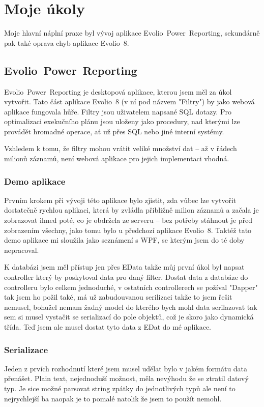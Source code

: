 \documentclass[czech,bachelor,dept460,male,csharp]{diploma}
\newcommand{\EvolioEight}{Evolio~8}
\newcommand{\EFilters}{Evolio~Power~Reporting}
\newcommand{\EData}{EData}
\begin{document}
\section{Moje úkoly}
	Moje hlavní náplní praxe byl vývoj aplikace {\EFilters}, sekundárně pak také oprava chyb aplikace {\EvolioEight}.
	\subsection{\EFilters}
		{\EFilters} je desktopová aplikace, kterou jsem měl za úkol vytvořit. Tato část aplikace {\EvolioEight} (v ní pod názvem "Filtry") by jako webová aplikace fungovala hůře.
		Filtry jsou uživatelem napsané SQL dotazy. Pro optimalizaci exekučního plánu jsou uloženy jako procedury, nad kterými lze provádět hromadné operace, ať už přes SQL nebo jiné interní systémy.
		
		Vzhledem k tomu, že filtry mohou vrátit veliké množství dat – až v řádech milionů záznamů, není webová aplikace pro jejich implementaci vhodná.
		\subsubsection{Demo aplikace}
			Prvním krokem při vývoji této aplikace bylo zjistit, zda vůbec lze vytvořit dostatečně rychlou aplikaci, která by zvládla přibližně milion záznamů a začala je zobrazovat ihned poté, co je obdržela ze serveru – bez potřeby stáhnout je před zobrazením všechny, jako tomu bylo u předchozí aplikace {\EvolioEight}.
			Taktéž tato demo aplikace mi sloužila jako seznámení s WPF, se kterým jsem do té doby nepracoval.
			
			K databázi jsem měl přístup jen přes {\EData} takže můj první úkol byl napsat controller který by poskytoval data pro daný filter. Dostat data z databáze do controlleru bylo celkem jednoduché, v ostatních controllerech se požíval "Dapper" tak jsem ho požil také, má už zabudouvanou serilizaci takže to jsem řešit nemusel, bohužel nemam žadný model do kterého bych mohl data serilazovat tak sem si musel vystačit se serializací do pole objektů, což je skoro jako dynamická třída. Teď jsem ale musel dostat tyto data z EDat do mé aplikace.
		\subsubsection{Serializace}
			Jeden z prvích rozhodnutí které jsem musel udělat bylo v jakém formátu data přenášet. Plain text, nejednoduší možnost, měla nevýhodu že se ztratil datový typ. Je sice možné parsovat string zpátky do jednotlivých typů ale není to nejrychlejší ba naopak je to pomalé natolik že jsem to použít nemohl.
			
\end{document}
